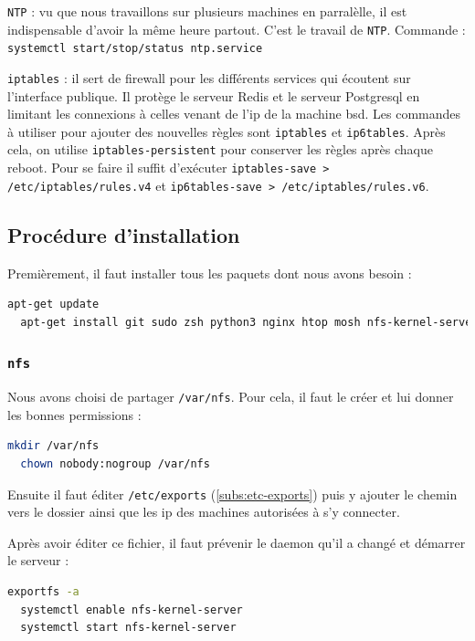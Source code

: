 \documentclass[10pt,a4paper]{article}
\begin{document}
\texttt{NTP} : vu que nous travaillons sur plusieurs machines en parralèlle, il est indispensable d'avoir la même heure partout.
C'est le travail de \texttt{NTP}.
Commande : \texttt{systemctl start/stop/status ntp.service}

\texttt{iptables} : il sert de firewall pour les différents services qui écoutent sur l'interface publique.
Il protège le serveur Redis et le serveur Postgresql en limitant les connexions à celles venant de l'ip de la machine bsd.
Les commandes à utiliser pour ajouter des nouvelles règles sont \texttt{iptables} et \texttt{ip6tables}.
Après cela, on utilise \texttt{iptables-persistent} pour conserver les règles après chaque reboot. Pour se faire il suffit d'exécuter \texttt{iptables-save > /etc/iptables/rules.v4} et \texttt{ip6tables-save > /etc/iptables/rules.v6}.


\subsection{Procédure d'installation}

Premièrement, il faut installer tous les paquets dont nous avons besoin :
\begin{lstlisting}[language=bash]
  apt-get update
  apt-get install git sudo zsh python3 nginx htop mosh nfs-kernel-server vim redis-server postgresql-server python3 python3-dev ntpdate ntp screen iptables-persistent
\end{lstlisting}

\subsubsection{\texttt{nfs}}

Nous avons choisi de partager \texttt{/var/nfs}. Pour cela, il faut le créer et lui donner les bonnes permissions :

\begin{lstlisting}[language=bash]
  mkdir /var/nfs
  chown nobody:nogroup /var/nfs
\end{lstlisting}

Ensuite il faut éditer \texttt{/etc/exports} (\ref{subs:etc-exports}) puis y ajouter le chemin vers
le dossier ainsi que les ip des machines autorisées à s'y connecter.

Après avoir éditer ce fichier, il faut prévenir le daemon qu'il a changé et démarrer le serveur :
\begin{lstlisting}[language=bash]
  exportfs -a
  systemctl enable nfs-kernel-server
  systemctl start nfs-kernel-server
\end{lstlisting}
\end{document}
